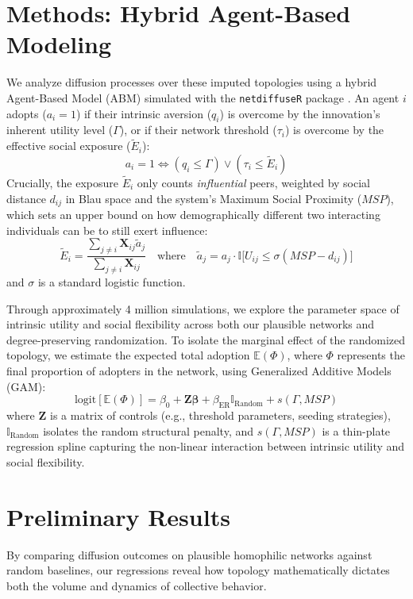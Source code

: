\documentclass[12pt, a4paper]{article}
\begin{document}
\section*{Methods: Hybrid Agent-Based Modeling}
We analyze diffusion processes over these imputed topologies using a hybrid Agent-Based Model (ABM) simulated with the \texttt{netdiffuseR} package \cite{vegayon2025}. An agent $i$ adopts ($a_i = 1$) if their intrinsic aversion ($q_i$) is overcome by the innovation's inherent utility level ($\Gamma$), or if their network threshold ($\tau_i$) is overcome by the effective social exposure ($\tilde{E}_i$):
$$ a_i = 1 \iff (q_i \le \Gamma) \lor (\tau_i \le \tilde{E}_i) $$
Crucially, the exposure $\tilde{E}_i$ only counts \textit{influential} peers, weighted by social distance $d_{ij}$ in Blau space and the system's Maximum Social Proximity ($MSP$), which sets an upper bound on how demographically different two interacting individuals can be to still exert influence:
$$ \tilde{E}_i = \frac{\sum_{j \neq i} \mathbf{X}_{ij} \tilde{a}_j}{\sum_{j \neq i} \mathbf{X}_{ij}} \quad \text{where} \quad \tilde{a}_j = a_j \cdot \mathbb{I}\Big[U_{ij} \le \sigma(MSP - d_{ij})\Big] $$
and $\sigma$ is a standard logistic function. 

Through approximately 4 million simulations, we explore the parameter space of intrinsic utility and social flexibility across both our plausible networks and degree-preserving randomization. To isolate the marginal effect of the randomized topology, we estimate the expected total adoption $\mathbb{E}(\Phi)$, where $\Phi$ represents the final proportion of adopters in the network, using Generalized Additive Models (GAM):
$$ \text{logit}[\mathbb{E}(\Phi)] = \beta_0 + \mathbf{Z}\boldsymbol{\beta} + \beta_{\text{ER}} \mathbb{I}_{\text{Random}} + s(\Gamma, MSP) $$
where $\mathbf{Z}$ is a matrix of controls (e.g., threshold parameters, seeding strategies), $\mathbb{I}_{\text{Random}}$ isolates the random structural penalty, and $s(\Gamma, MSP)$ is a thin-plate regression spline capturing the non-linear interaction between intrinsic utility and social flexibility.

\section*{Preliminary Results}
By comparing diffusion outcomes on plausible homophilic networks against random baselines, our regressions reveal how topology mathematically dictates both the volume and dynamics of collective behavior. 
\end{document}
